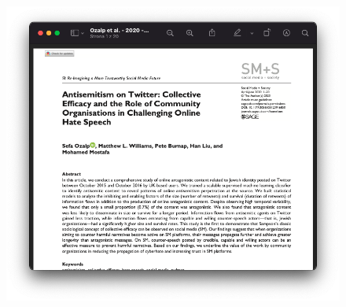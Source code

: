 \documentclass{beamer}
\begin{document}
\begin{frame}
{\begin{figure}
            \includegraphics[width = \textwidth]{twitter2.png}
        \end{figure}
    }
    
\end{frame}
\end{document}
